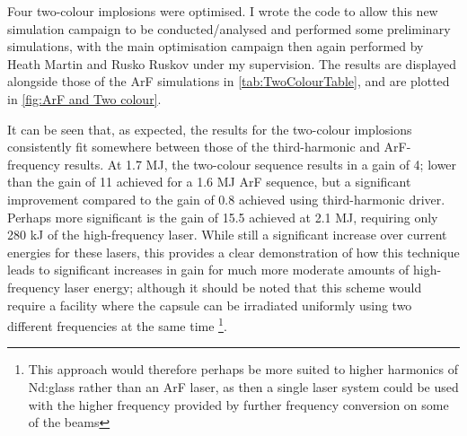 Four two-colour implosions were optimised. I wrote the code to allow this new simulation campaign to be conducted/analysed and performed some preliminary simulations, with the main optimisation campaign then again performed by Heath Martin and Rusko Ruskov under my supervision. The results are displayed alongside those of the ArF simulations in \ref{tab:TwoColourTable}, and are plotted in \ref{fig:ArF and Two colour}.

It can be seen that, as expected, the results for the two-colour implosions consistently fit somewhere between those of the third-harmonic and ArF-frequency results. At 1.7 MJ, the two-colour sequence results in a gain of 4; lower than the gain of 11 achieved for a 1.6 MJ ArF sequence, but a significant improvement compared to the gain of 0.8 achieved using third-harmonic driver. Perhaps more significant is the gain of 15.5 achieved at 2.1 MJ, requiring only 280 kJ of the high-frequency laser. While still a significant increase over current energies for these lasers, this provides a clear demonstration of how this technique leads to significant increases in gain for much more moderate amounts of high-frequency laser energy; although it should be noted that this scheme would require a facility where the capsule can be irradiated uniformly using two different frequencies at the same time \footnote{This approach would therefore perhaps be more suited to higher harmonics of Nd:glass rather than an ArF laser, as then a single laser system could be used with the higher frequency provided by further frequency conversion on some of the beams}.

